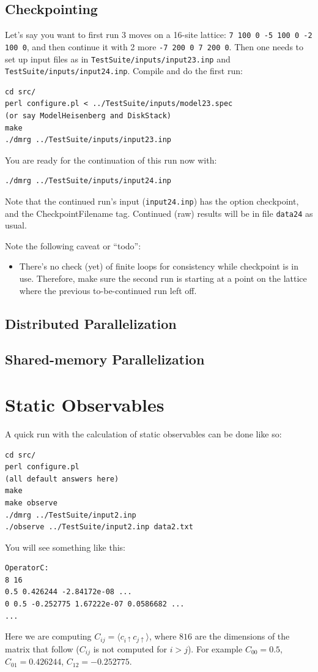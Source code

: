 \documentclass[paper=letter]{scrartcl}
\begin{document}
\subsection{Checkpointing}
Let's say you want to first run 3 moves on a 16-site lattice:
\verb=7 100 0 -5 100 0 -2 100 0=, and then continue it with 2 more
\verb=-7 200 0 7 200 0=. Then one needs to set up input files as in 
\verb=TestSuite/inputs/input23.inp=
and
\verb=TestSuite/inputs/input24.inp=.
Compile and do the first run:
\begin{verbatim}
cd src/
perl configure.pl < ../TestSuite/inputs/model23.spec
(or say ModelHeisenberg and DiskStack)
make
./dmrg ../TestSuite/inputs/input23.inp
\end{verbatim}
You are ready for the continuation of this run now with:
\begin{verbatim}
./dmrg ../TestSuite/inputs/input24.inp
\end{verbatim}
Note that the continued run's input (\verb=input24.inp=) has the option checkpoint, 
and the CheckpointFilename tag.
Continued (raw) results will be in file \verb=data24= as usual.

Note the following caveat or ``todo'':
\begin{itemize}
\item There's no check (yet) of finite loops for consistency while checkpoint is in use.
Therefore, make sure the second run is starting at a point on the lattice where the
previous to-be-continued run left off.
\end{itemize} 

\subsection{Distributed Parallelization}
\subsection{Shared-memory Parallelization}

\section{Static Observables}
A quick run with the calculation of static observables can be done like so:
\begin{verbatim}
cd src/
perl configure.pl
(all default answers here)
make
make observe
./dmrg ../TestSuite/input2.inp
./observe ../TestSuite/input2.inp data2.txt
\end{verbatim}
You will see something like this:
\begin{verbatim}
OperatorC:
8 16
0.5 0.426244 -2.84172e-08 ...
0 0.5 -0.252775 1.67222e-07 0.0586682 ...
...
\end{verbatim}
Here we are computing $C_{ij} = \langle c_{i\uparrow}c_{j\uparrow}\rangle$, where $8 16$ are the dimensions of the matrix 
that follow ($C_{ij}$ is not computed for $i>j$).
For example $C_{00}=0.5$, $C_{01}=0.426244$, $C_{12}=-0.252775$. 
\end{document}
